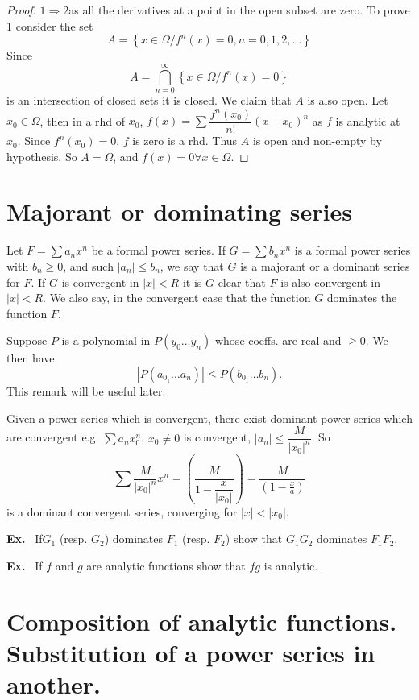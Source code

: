 \begin{proof}
$1\Rightarrow 2$\pageoriginale as all the derivatives at a point in the open subset are zero. To prove 1 consider the set
$$
A=\left\{x\in \Omega / f^{n}(x)=0,n=0,1,2,\ldots\right\}
$$
Since
$$
A=\bigcap\limits^{\infty}_{n=0}\left\{x\in \Omega / f^{n}(x)=0\right\}
$$
is an intersection of closed sets it is closed. We claim that $A$ is also open. Let $x_{0}\in \Omega$, then in a rhd of $x_{0}$, $f(x)=\sum \dfrac{f^{n}(x_{0})}{n!}(x-x_{0})^{n}$ as $f$ is analytic at $x_{0}$. Since $f^{n}(x_{0})=0$, $f$ is zero is a rhd. Thus $A$ is open and non-empty by hypothesis. So $A=\Omega$, and $f(x)=0\forall x\in \Omega$.
\end{proof}

\section*{Majorant or dominating series}

Let $F=\sum a_{n}x^{n}$ be a formal power series. If $G=\sum b_{n}x^{n}$ is a formal power series with $b_{n}\geq 0$, and such $|a_{n}|\leq b_{n}$, we say that $G$ is a majorant or a dominant series for $F$. If $G$ is convergent in $|x|<R$ it is $G$ clear that $F$ is also convergent in $|x|<R$. We also say, in the convergent case that the function $G$ dominates the function $F$.

Suppose $P$ is a polynomial in $P(y_{0}\ldots y_{n})$ whose coeffs. are real and $\geq 0$. We then have
$$
\left| P\left(a_{0_{1}}\ldots a_{n}\right)\right|\leq P\left(b_{0_{1}}\ldots b_{n}\right).
$$
This remark will be useful later.

Given a power series which is convergent, there exist dominant power series which are convergent e.g. $\sum a_{n}x^{n}_{0}$, $x_{0}\neq 0$ is convergent, $|a_{n}|\leq \dfrac{M}{|x_{0}|^{n}}$. So
$$
\sum \dfrac{M}{|x_{0}|^{n}}x^{n}=\left(\dfrac{M}{1-\dfrac{x}{|x_{0}|}}\right)=\dfrac{M}{\left(1-\frac{x}{a}\right)}
$$
is a dominant convergent series, converging for $|x|<|x_{0}|$.

\noindent
{\bf Ex.}~ If\pageoriginale $G_{1}$ (resp. $G_{2}$) dominates $F_{1}$ (resp. $F_{2}$) show that $G_{1}G_{2}$ dominates $F_{1}F_{2}$.

\noindent
{\bf Ex.}~ If $f$ and $g$ are analytic functions show that $fg$ is analytic.

\section*{Composition of analytic functions. Substitution of a power series in another.}

